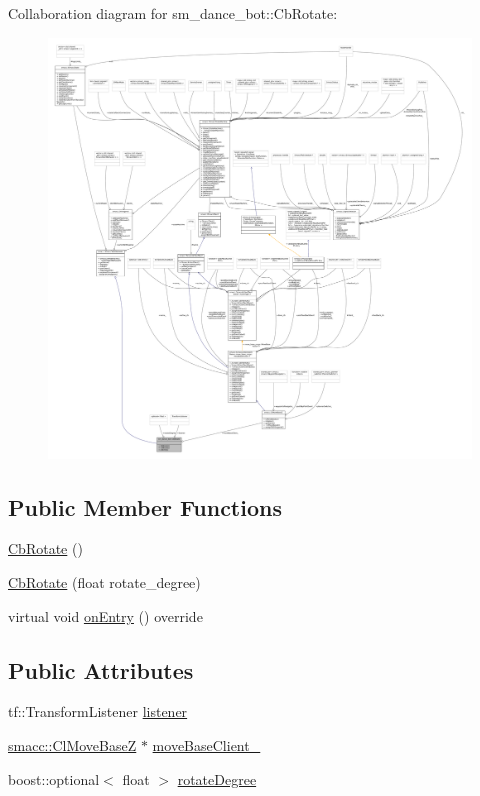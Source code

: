 Collaboration diagram for sm\+\_\+dance\+\_\+bot\+:\+:Cb\+Rotate\+:
\nopagebreak
\begin{figure}[H]
\begin{center}
\leavevmode
\includegraphics[width=350pt]{classsm__dance__bot_1_1CbRotate__coll__graph}
\end{center}
\end{figure}
\subsection*{Public Member Functions}
\begin{DoxyCompactItemize}
\item 
\hyperlink{classsm__dance__bot_1_1CbRotate_a56c0ab90797abc95aa5357fd404fa37c}{Cb\+Rotate} ()
\item 
\hyperlink{classsm__dance__bot_1_1CbRotate_ad05e2b97f956e8616b7bcfc0ebe1a160}{Cb\+Rotate} (float rotate\+\_\+degree)
\item 
virtual void \hyperlink{classsm__dance__bot_1_1CbRotate_ad4e05a82d567baea5e373b7eec187760}{on\+Entry} () override
\end{DoxyCompactItemize}
\subsection*{Public Attributes}
\begin{DoxyCompactItemize}
\item 
tf\+::\+Transform\+Listener \hyperlink{classsm__dance__bot_1_1CbRotate_a40f03a928591fed26f84a35be9ddc741}{listener}
\item 
\hyperlink{classsmacc_1_1ClMoveBaseZ}{smacc\+::\+Cl\+Move\+BaseZ} $\ast$ \hyperlink{classsm__dance__bot_1_1CbRotate_acbdfc540d60c0cdb3a1e592bede8b5c5}{move\+Base\+Client\+\_\+}
\item 
boost\+::optional$<$ float $>$ \hyperlink{classsm__dance__bot_1_1CbRotate_aede47d27b6caff0d5459afd1762ddda2}{rotate\+Degree}
\end{DoxyCompactItemize}


